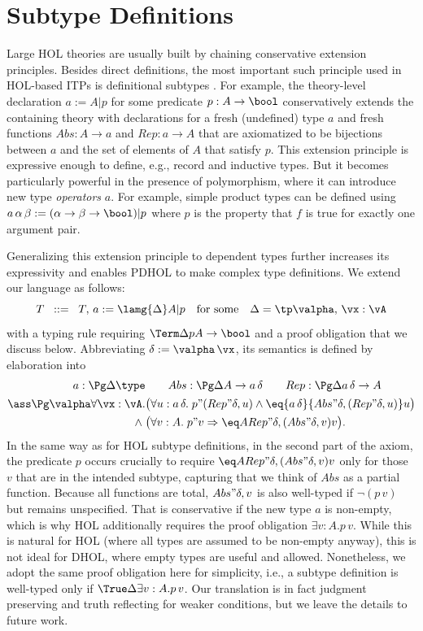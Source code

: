 \section{Subtype Definitions}\label{sec:std}

Large HOL theories are usually built by chaining conservative extension principles.
Besides direct definitions, the most important such principle used in HOL-based ITPs is definitional subtypes \cite{holsemantics}.
For example, the theory-level declaration $a:=A|p$ for some predicate $p:A\to\bool$ conservatively extends the containing theory with declarations for a fresh (undefined) type $a$ and fresh functions $Abs:A\to a$ and $Rep:a\to A$ that are axiomatized to be bijections between $a$ and the set of elements of $A$ that satisfy $p$.
This extension principle is expressive enough to define, e.g., record and inductive types.
But it becomes particularly powerful in the presence of polymorphism, where it can introduce new type \emph{operators} $a$.
For example, simple product types can be defined using $a\,\alpha\,\beta:=(\alpha\to\beta\to\bool)|p$ where $p$ is the property that $f$ is true for exactly one argument pair.

Generalizing this extension principle to dependent types further increases its expressivity and enables PDHOL to make complex type definitions.
We extend our language as follows:
\[T\;\;  ::=\;\; T,\, a:=\lamg{\Delta}A|p \quad\text{for some}\quad \Delta=\tp\valpha,\,
  \vx:\vA\]
with a typing rule requiring $\Term\Delta p{A\to \bool}$ and a proof obligation that we discuss below.
Abbreviating $\delta:=\valpha\,\vx$, its semantics is defined by elaboration into
\newcommand{\aq}{a\,\delta}
\newcommand{\Repq}[1]{Rep"{\delta,#1}}
\newcommand{\Absq}[1]{Abs"{\delta,#1}}
\begin{align*}
a:\Pg\Delta \type& \qquad
  Abs: \Pg\Delta A\to \aq \qquad
  Rep: \Pg\Delta\aq\to A\\
\ass \Pg\valpha \forall\vx:\vA.&\big(\forall u:\aq.\;p"{(\Repq u)}\wedge\eq{\aq}{\Absq{(\Repq
  u)}}u\big)\\
  \wedge \;&\big(\forall v:A.\;p"v\Rightarrow \eq A{\Repq{(\Absq v)}}v\big).
\end{align*}
In the same way as for HOL subtype definitions, in the second part of the axiom, the predicate $p$ occurs crucially to require $\eq A{\Repq{(\Absq v)}}v$ only for those $v$ that are in the intended subtype, capturing that we think of $Abs$ as a partial function.
Because all functions are total, $\Absq v$ is also well-typed if $\neg (p\,v)$ but remains unspecified.
That is conservative if the new type $a$ is non-empty, which is why HOL additionally requires the proof obligation $\exists v:A.p\,v$.
While this is natural for HOL (where all types are assumed to be non-empty anyway), this is not ideal for DHOL, where empty types are useful and allowed.
Nonetheless, we adopt the same proof obligation here for simplicity, i.e., a subtype definition is well-typed only if $\True\Delta{\exists v:A.p\,v}$.
Our translation is in fact judgment preserving and truth reflecting for weaker conditions, but we leave the details to future work.

